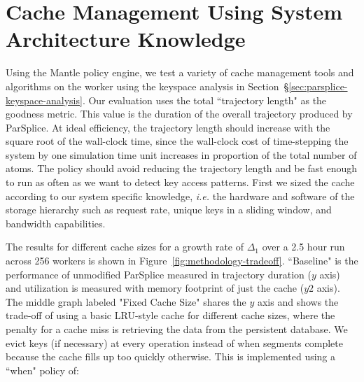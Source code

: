 %
%
%
%

\section{Cache Management Using System Architecture Knowledge}
\label{sec:arch-specific}

Using the Mantle policy engine, we test a variety of cache management tools and
algorithms on the worker using the keyspace analysis in
Section~\S\ref{sec:parsplice-keyspace-analysis}.  Our evaluation uses the total
``trajectory length" as the goodness metric. This value is the duration of the
overall trajectory produced by ParSplice. At ideal efficiency, the trajectory
length should increase with the square root of the wall-clock time, since the
wall-clock cost of time-stepping the system by one simulation time unit
increases in proportion of the total number of atoms.  The policy should avoid
reducing the trajectory length and be fast enough to run as often as we want to
detect key access patterns.  First we sized the cache according to our system
specific knowledge, {\it i.e.} the hardware and software of the storage
hierarchy such as request rate, unique keys in a sliding window, and bandwidth
capabilities. 

The results for different cache sizes for a growth rate of \(\Delta_1\) over a
2.5 hour run across 256 workers is shown in
Figure~\ref{fig:methodology-tradeoff}.  ``Baseline" is the performance of
unmodified ParSplice  measured in trajectory duration (\(y\) axis) and
utilization is measured with memory footprint of just the cache (\(y2\) axis).
The middle graph labeled "Fixed Cache Size" shares the \(y\) axis and shows the
trade-off of using a basic LRU-style cache for different cache sizes, where the
penalty for a cache miss is retrieving the data from the persistent database.
We evict keys (if necessary) at every operation instead of when segments
complete because the cache fills up too quickly otherwise. This is implemented
using a ``when" policy of:


